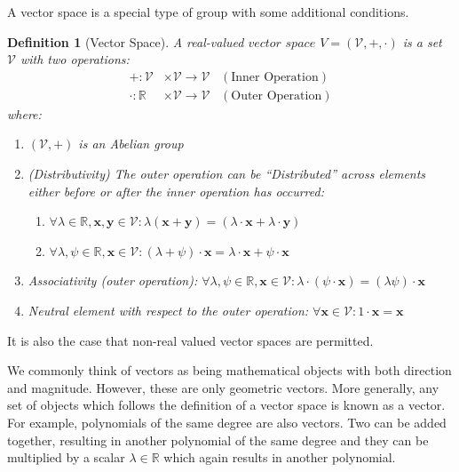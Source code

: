 \documentclass[a4paper,12pt]{article}
\newcommand{\set}[1]{\mathcal{#1}}
\newcommand{\vectr}[1]{\textbf{#1}}
\newcommand{\real}{\mathbb{R}}
\newcommand{\italic}[1]{\textit{#1}}
\newtheorem{definition}{Definition}[section]
\begin{document}
	
	A vector space \cite{def_vector_space} is a special type of group with some additional conditions. 
	
	\begin{definition}[Vector Space]
		\normalfont A real-valued $\italic{vector space}$ $V = (\set{V}, +, \cdot)$ is a set $\set{V}$ with two operations:
		\begin{align}
			+: \set{V} &\times \set{V} \rightarrow \set{V} \hspace{10pt} (\text{Inner Operation}) \\
			\cdot: \real &\times \set{V} \rightarrow \set{V} \hspace{10pt} (\text{Outer Operation})
		\end{align}
		where:
		\begin{enumerate}
			\item $(\set{V}, +)$ is an Abelian group
			\item (Distributivity) The outer operation can be ``Distributed'' across elements either before or after the inner operation has occurred: 
			\begin{enumerate}
				\item $\forall \lambda \in \real, \vectr{x}, \vectr{y} \in \mathcal{V}: \lambda (\vectr{x} + \vectr{y}) = (\lambda \cdot \vectr{x} + \lambda \cdot \vectr{y})$
				\item $\forall \lambda, \psi \in \real, \vectr{x} \in \set{V}: (\lambda + \psi) \cdot \vectr{x} = \lambda \cdot \vectr{x} + \psi \cdot \vectr{x}$
			\end{enumerate} 
			\item Associativity (outer operation): $\forall \lambda, \psi \in \real, \vectr{x} \in \set{V}: \lambda \cdot (\psi \cdot \vectr{x}) = (\lambda \psi) \cdot \vectr{x}$
			\item Neutral element with respect to the outer operation: $\forall \vectr{x} \in \set{V}: 1 \cdot \vectr{x} = \vectr{x}$
		\end{enumerate}
		\label{def:vector_space}
	\end{definition}
	It is also the case that non-real valued vector spaces are permitted. 
	
	We commonly think of vectors as being mathematical objects with both direction and magnitude. However, these are only geometric vectors. More generally, any set of objects which follows the definition of a vector space is known as a vector. For example, polynomials of the same degree are also vectors. Two can be added together, resulting in another polynomial of the same degree and they can be multiplied by a scalar $ \lambda \in \real $ which again results in another polynomial. 
	
\end{document}
